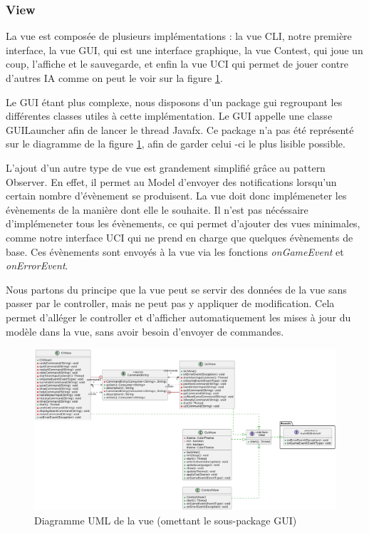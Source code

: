 \documentclass{article}
\begin{document}
\subsubsection{View}
La vue est composée de plusieurs implémentations : la vue CLI, notre première interface, la vue GUI, qui est une interface graphique, la vue Contest, qui joue un coup, l'affiche et le sauvegarde,
et enfin la vue UCI qui permet de jouer contre d'autres IA comme on peut le voir sur la figure \ref{umlView}.

Le GUI étant plus complexe, nous disposons d'un package gui regroupant les différentes classes utiles à cette implémentation. Le GUI appelle une classe GUILauncher afin de lancer
le thread Javafx. Ce package n'a pas été représenté sur le diagramme de la figure \ref{umlView}, afin de garder celui -ci le plus lisible possible.

L'ajout d'un autre type de vue est grandement simplifié grâce au pattern Observer. En effet, il permet au Model d'envoyer des notifications lorsqu'un certain nombre d'évènement
se produisent. La vue doit donc implémeneter les évènements de la manière dont elle le souhaite. Il n'est pas nécéssaire d'implémeneter tous les évènements, ce qui permet d'ajouter des vues minimales,
comme notre interface UCI qui ne prend en charge que quelques évènements de base. Ces évènements sont envoyés à la vue via les fonctions \textit{onGameEvent} et \textit{onErrorEvent}.

Nous partons du principe que la vue peut se servir des données de la vue sans passer par le controller, mais ne peut pas y appliquer de modification. Cela permet d'alléger le controller
et d'afficher automatiquement les mises à jour du modèle dans la vue, sans avoir besoin d'envoyer de commandes.

\begin{figure}[h]
    \centering
    \includegraphics[width=\textwidth]{uml_view}
    \caption{Diagramme UML de la vue (omettant le sous-package GUI)}
    \label{umlView}
\end{figure}
\FloatBarrier
\end{document}
